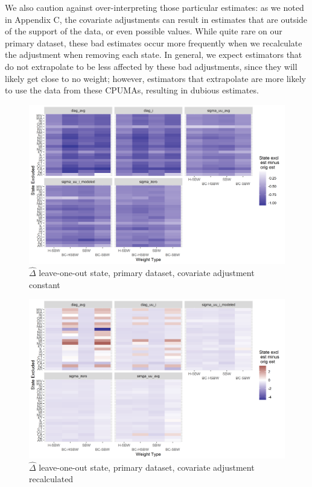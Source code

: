 We also caution against over-interpreting those particular estimates: as we noted in Appendix C, the covariate adjustments can result in estimates that are outside of the support of the data, or even possible values. While quite rare on our primary dataset, these bad estimates occur more frequently when we recalculate the adjustment when removing each state. In general, we expect estimators that do not extrapolate to be less affected by these bad adjustments, since they will likely get close to no weight; however, estimators that extrapolate are more likely to use the data from these CPUMAs, resulting in dubious estimates. 

\begin{figure}[]
\begin{center}
    \caption{$\hat{\Delta}$ leave-one-out state, primary dataset, covariate adjustment constant}
    \label{fig:rdiffc1state}
    \includegraphics[scale=0.6]{01_Plots/loostate-repub-sensitivityc1-state-main.png}
\end{center}
\end{figure}

\begin{figure}[]
\begin{center}
    \caption{$\hat{\Delta}$ leave-one-out state, primary dataset, covariate adjustment recalculated}
    \label{fig:rdiffc1proc}
    \includegraphics[scale=0.6]{01_Plots/loostate-repub-sensitivityc1-proc-main.png}
\end{center}
\end{figure}


